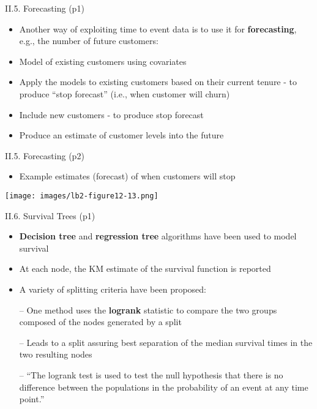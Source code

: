 \documentclass[handout]{beamer}
\newcommand{\strong}[1]{\textbf{\color{teal} #1}}
\begin{document}
\begin{frame}{II.5. Forecasting (p1)}
\begin{itemize}
\item Another way of exploiting time to event data is to use it for \strong{forecasting}, e.g., the number of future customers:
\item Model of existing customers using covariates
\item Apply the models to existing customers based on their current tenure - to produce ``stop forecast'' (i.e., when customer will churn)
\item Include new customers - to produce stop forecast
\item Produce an estimate of customer levels into the future
\end{itemize}
\end{frame}
\begin{frame}{II.5. Forecasting (p2)}
\begin{itemize}
\item Example estimates (forecast) of when customers will stop
\end{itemize}
\begin{center}
\texttt{[image: images/lb2-figure12-13.png]} \\
\cite[Figure 12.13]{LB2:2004}
\end{center}
\end{frame}
\begin{frame}{II.6. Survival Trees (p1)}
\begin{itemize}
\item \strong{Decision tree} and \strong{regression tree} algorithms have been used to model survival
\item At each node, the KM estimate of the survival function is reported
\item A variety of splitting criteria have been proposed:
\item[--] One method uses the \strong{logrank} statistic to compare the two groups composed of the nodes generated by a split~\cite{ciampi-et-al:1986}
\item[--] Leads to a split assuring best separation of the median survival times in the two resulting nodes 
\item[--] ``The logrank test is used to test the null hypothesis that there is no difference between the populations in the probability of an event at any time point.''~\cite{bland-altman:2004}
\end{itemize}
\end{frame}
\end{document}
